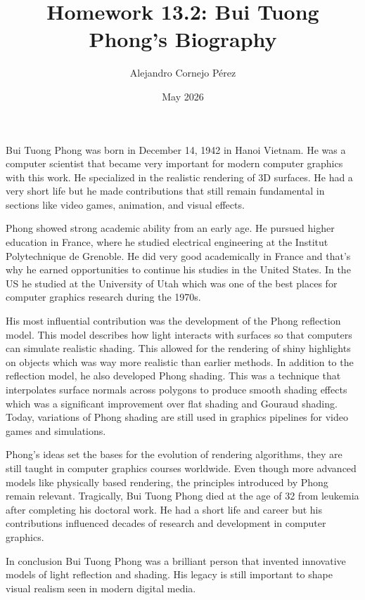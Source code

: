 \documentclass[11pt]{article}
\title{Homework 13.2: Bui Tuong Phong's Biography}
\author{Alejandro Cornejo Pérez}
\date{May 2026}
\begin{document}
\maketitle
Bui Tuong Phong was born in December 14, 1942 in Hanoi Vietnam. He was a computer scientist that became very important for modern computer graphics with this work. He specialized in the realistic rendering of 3D surfaces. He had a very short life but he made contributions that still remain fundamental in sections like video games, animation, and visual effects.

Phong showed strong academic ability from an early age. He pursued higher education in France, where he studied electrical engineering at the Institut Polytechnique de Grenoble. He did very good academically in France and that's why he earned opportunities to continue his studies in the United States. In the US he studied at the University of Utah which was one of the best places for computer graphics research during the 1970s.

His most influential contribution was the development of the Phong reflection model. This model describes how light interacts with surfaces so that computers can simulate realistic shading. This allowed for the rendering of shiny highlights on objects which was way more realistic than earlier methods. In addition to the reflection model, he also developed Phong shading. This was a technique that interpolates surface normals across polygons to produce smooth shading effects which was a significant improvement over flat shading and Gouraud shading. Today, variations of Phong shading are still used in graphics pipelines for video games and simulations.

Phong’s ideas set the bases for the evolution of rendering algorithms, they are still taught in computer graphics courses worldwide. Even though more advanced models like physically based rendering, the principles introduced by Phong remain relevant. Tragically, Bui Tuong Phong died at the age of 32 from leukemia after completing his doctoral work. He had a short life and career but his contributions influenced decades of research and development in computer graphics.

In conclusion Bui Tuong Phong was a brilliant person that invented innovative models of light reflection and shading. His legacy is still important to shape visual realism seen in modern digital media.
\end{document}

